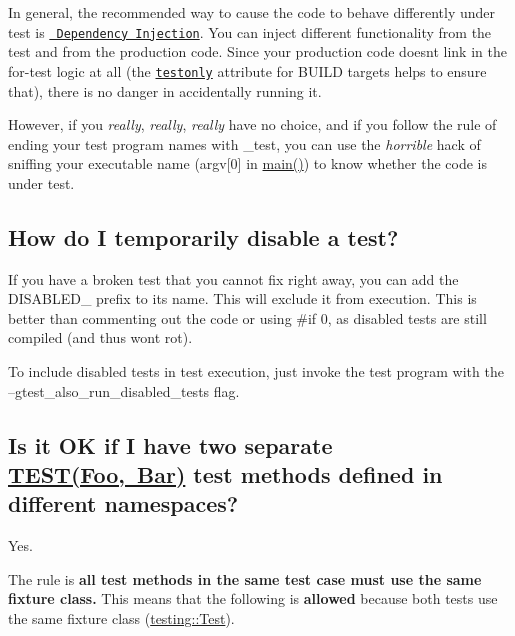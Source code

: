In general, the recommended way to cause the code to behave differently under test is \href{https://en.wikipedia.org/wiki/Dependency_injection}{\texttt{ Dependency Injection}}. You can inject different functionality from the test and from the production code. Since your production code doesn\textquotesingle{}t link in the for-\/test logic at all (the \href{https://docs.bazel.build/versions/master/be/common-definitions.html\#common.testonly}{\texttt{ {\ttfamily testonly}}} attribute for B\+U\+I\+LD targets helps to ensure that), there is no danger in accidentally running it.

However, if you {\itshape really}, {\itshape really}, {\itshape really} have no choice, and if you follow the rule of ending your test program names with {\ttfamily \+\_\+test}, you can use the {\itshape horrible} hack of sniffing your executable name ({\ttfamily argv\mbox{[}0\mbox{]}} in {\ttfamily \mbox{\hyperlink{_be_01vektoriaus_2main_8cpp_ae66f6b31b5ad750f1fe042a706a4e3d4}{main()}}}) to know whether the code is under test.

\subsection*{How do I temporarily disable a test?}

If you have a broken test that you cannot fix right away, you can add the D\+I\+S\+A\+B\+L\+E\+D\+\_\+ prefix to its name. This will exclude it from execution. This is better than commenting out the code or using \#if 0, as disabled tests are still compiled (and thus won\textquotesingle{}t rot).

To include disabled tests in test execution, just invoke the test program with the --gtest\+\_\+also\+\_\+run\+\_\+disabled\+\_\+tests flag.

\subsection*{Is it OK if I have two separate {\ttfamily \mbox{\hyperlink{_obj__test_2lib_2googletest-release-1_88_81_2googletest_2include_2gtest_2gtest_8h_ad8b332753515c0ab8baada563c2547eb}{T\+E\+S\+T(\+Foo, Bar)}}} test methods defined in different namespaces?}

Yes.

The rule is {\bfseries{all test methods in the same test case must use the same fixture class.}} This means that the following is {\bfseries{allowed}} because both tests use the same fixture class ({\ttfamily \mbox{\hyperlink{classtesting_1_1_test}{testing\+::\+Test}}}).


